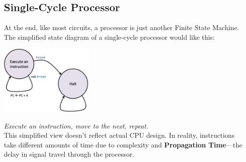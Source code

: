 \subsection{Single-Cycle Processor}
At the end, like most circuits, a processor is just another Finite State Machine. The simplified state diagram of a single-cycle processor would like this:
\begin{center}
    \includegraphics[width=0.35\textwidth]{chapters/chapter2a/images/fsm.png}
\end{center}
\textit{Execute an instruction, move to the next, repeat.} \\
This simplified view doesn't reflect actual CPU design. In reality, instructions take different amounts of time due to complexity and \textbf{Propagation Time}—the delay in signal travel through the processor.

